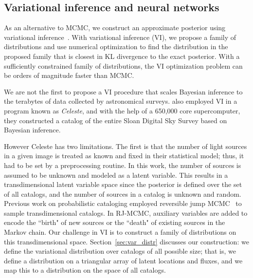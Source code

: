\subsection{Variational inference and neural networks}
As an alternative to MCMC, we construct an approximate posterior using variational inference~\cite{Blei_2017_vi_review,Jordan_intro_vi, Wainwrite_graph_models_vi}.
With variational inference (VI), we propose a family of distributions and use numerical optimization to find the distribution 
in the proposed family that is closest 
in KL divergence to the exact posterior. 
With a sufficiently constrained family of distributions, the VI optimization problem can be orders of magnitude faster than MCMC. 

We are not the first to propose a VI procedure
that scales Bayesian inference to the terabytes of data collected by astronomical surveys. 
\cite{regier2019_celeste} also employed 
VI in a program known as {\itshape Celeste}, and with the help of a 650,000 core supercomputer, they constructed a catalog of the entire Sloan Digital Sky Survey based on Bayesian inference. 

However Celeste has two limitations. The first is that the number of light sources in a given image is treated as known and fixed in their statistical model; thus, it had to be set by a preprocessing routine. In this work, the number of sources is assumed to be unknown and modeled as a latent variable. 
This results in a transdimensional latent variable space 
since the posterior is defined over the set of all catalogs, and the number of sources in a catalog is unknown and random.
Previous work on probabilistic cataloging employed reversible jump MCMC~\cite{Green95reversiblejump} to sample transdimensional catalogs. In RJ-MCMC, auxiliary variables are added to encode the ``birth" of new sources 
or the ``death" of existing sources in the Markov chain. Our challenge in VI is to construct a family of distributions on this transdimensional space. Section~\ref{sec:var_distr} discusses our construction: we define the variational distribution over catalogs of all possible size; that is, we define a distribution on a triangular array of latent locations and fluxes, and we map this to a distribution 
on the space of all catalogs.

